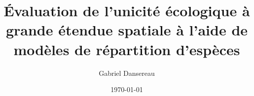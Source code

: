 \documentclass[12pt,twoside,maitrise]{dms}
\numberwithin{equation}{section}
\numberwithin{table}{chapter}
\numberwithin{figure}{chapter}
\begin{document}



\title{Évaluation de l'unicité écologique à grande étendue spatiale à l'aide de 
       modèles de répartition d'espèces}

\author{Gabriel Dansereau}



\date{\today} %










\end{document}
